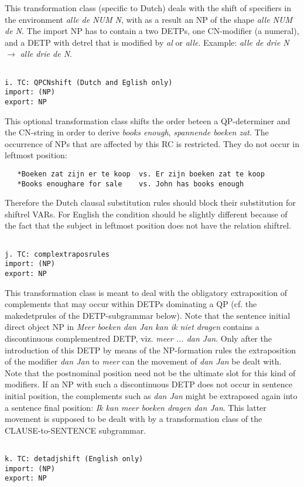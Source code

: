 This transformation class (specific to Dutch) deals with the shift of
specifiers in the environment {\em alle de NUM N}, with as a result an NP of
the shape {\em alle NUM de N}. The import NP has to contain a two DETPs, one
CN-modifier (a numeral), and a DETP with detrel that is modified by {\em al} or
{\em alle}. Example: {\em alle de drie N} $\rightarrow$ {\em alle drie de N}.
\begin{verbatim}

i. TC: QPCNshift (Dutch and Eglish only)
import: (NP)
export: NP
\end{verbatim}
This optional transformation class shifts the order beteen a QP-determiner and
the CN-string in order to derive {\em books enough}, {\em spannende boeken zat}.
The occurrence of NPs that are affected by this RC 
is restricted. They do not
occur in leftmost position:
\begin{verbatim}
   *Boeken zat zijn er te koop  vs. Er zijn boeken zat te koop
   *Books enoughare for sale    vs. John has books enough
\end{verbatim}
Therefore the Dutch clausal substitution rules 
should block their substitution for shiftrel VARs. For English the condition 
should be slightly different because of the fact that the subject in leftmost 
position does not have the relation shiftrel.
\begin{verbatim}

j. TC: complextraposrules
import: (NP)
export: NP
\end{verbatim}
This transformation class is meant to deal with the obligatory extraposition of
complements that may occur within DETPs dominating a QP (cf. the makedetprules
of the DETP-subgrammar below). Note that the sentence initial direct object NP
in {\em Meer boeken dan Jan kan ik niet dragen} contains a discontinuous
complementred DETP, viz. {\em meer ... dan Jan}. Only after the introduction of
this DETP by means of the NP-formation rules the extraposition of the modifier
{\em dan Jan} to {\em meer} can the movement of {\em dan Jan} be dealt with.
Note that the postnominal position need not be the ultimate slot for this kind
of modifiers. If an NP with such a discontinuous DETP does not occur in
sentence initial position, the complements such as {\em dan Jan} might be
extraposed again into a sentence final position: {\em Ik kan meer boeken dragen
dan Jan}. This latter movement is supposed to be dealt with by a transformation
class of the CLAUSE-to-SENTENCE subgrammar. 
\begin{verbatim}

k. TC: detadjshift (English only)
import: (NP)
export: NP
\end{verbatim}
